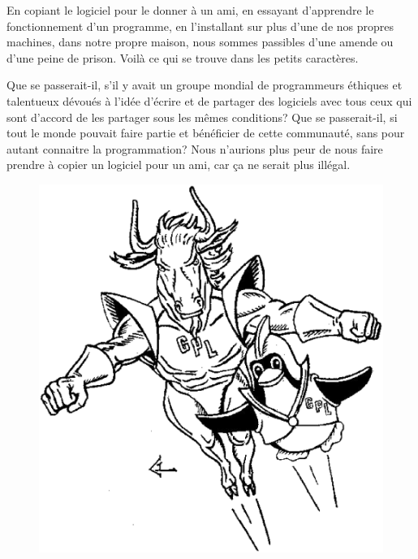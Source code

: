 \documentclass[12pt]{article}
\begin{document}
En copiant le logiciel pour le donner à un ami, en essayant d'apprendre le
fonctionnement d'un programme, en l'installant sur plus d'une de nos propres
machines, dans notre propre maison, nous sommes passibles d'une amende ou d'une
peine de prison. Voilà ce qui se trouve dans les petits caractères.


Que se passerait-il, s'il y avait un groupe mondial de programmeurs éthiques et
talentueux dévoués à l'idée d'écrire et de partager des logiciels avec tous
ceux qui sont d'accord de les partager sous les mêmes conditions? Que se
passerait-il, si tout le monde pouvait faire partie et bénéficier de cette
communauté, sans pour autant connaitre la programmation? Nous n'aurions plus
peur de nous faire prendre à copier un logiciel pour un ami, car ça ne serait
plus illégal.


\begin{figure}
 \begin{center}
   \includegraphics[scale=0.22]{dynamic-duo-bw.eps}
 \end{center}
\end{figure}
\end{document}
